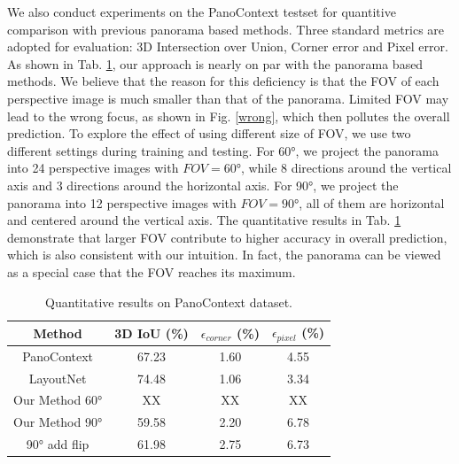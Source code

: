 We also conduct experiments on the PanoContext testset for quantitive comparison with previous panorama based methods. Three standard metrics are adopted for evaluation: 3D Intersection over Union, Corner error and Pixel error. As shown in Tab. \ref{tab:PC}, our approach is nearly on par with the panorama based methods. We believe that the reason for this deficiency is that the FOV of each perspective image is much smaller than that of the panorama. Limited FOV may lead to the wrong focus, as shown in Fig. \ref{wrong}, which then pollutes the overall prediction. To explore the effect of using different size of FOV, we use two different settings during training and testing. For \ang{60}, we project the panorama into 24 perspective images with $FOV=\ang{60}$, while 8 directions around the vertical axis and 3 directions around the horizontal axis. For \ang{90}, we project the panorama into 12 perspective images with $FOV=\ang{90}$, all of them are horizontal and centered around the vertical axis. The quantitative results in Tab. \ref{tab:PC} demonstrate that larger FOV contribute to higher accuracy in overall prediction, which is also consistent with our intuition. In fact, the panorama can be viewed as a special case that the FOV reaches its maximum.






\begin{table}
	\caption{Quantitative results on PanoContext dataset.}
	\label{tab:PC}
	\begin{tabular}{cccc}
		\toprule
		Method&3D IoU (\%)& $\epsilon_{corner}$ (\%) & $\epsilon_{pixel}$ (\%)\\
		\midrule
		PanoContext & 67.23 & 1.60 & 4.55\\
		LayoutNet & 74.48 & 1.06 & 3.34\\
		Our Method \ang{60} & XX & XX & XX\\	
		Our Method \ang{90} & 59.58 & 2.20 & 6.78\\	
		\ang{90} add flip & 61.98 & 2.75 & 6.73\\	
		\bottomrule
	\end{tabular}
\end{table}

